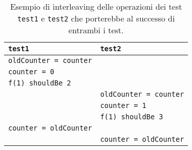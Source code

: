 \begin{table}[!ht]
  \centering
  \begin{tabular}{ll}
    \toprule
    \lstinline|test1|                & \lstinline|test2|                \\
    \midrule
    \lstinline|oldCounter = counter| &                                  \\
    \lstinline|counter = 0|          &                                  \\
    \lstinline|f(1) shouldBe 2|      &                                  \\
                                     & \lstinline|oldCounter = counter| \\
                                     & \lstinline|counter = 1|          \\
                                     & \lstinline|f(1) shouldBe 3|      \\
    \lstinline|counter = oldCounter| &                                  \\
                                     & \lstinline|counter = oldCounter| \\
    \bottomrule
  \end{tabular}
  \caption{Esempio di interleaving delle operazioni dei test \lstinline|test1| e \lstinline|test2| che porterebbe al successo di entrambi i test.}
  \label{table:test-f-interleaving-success}
\end{table}